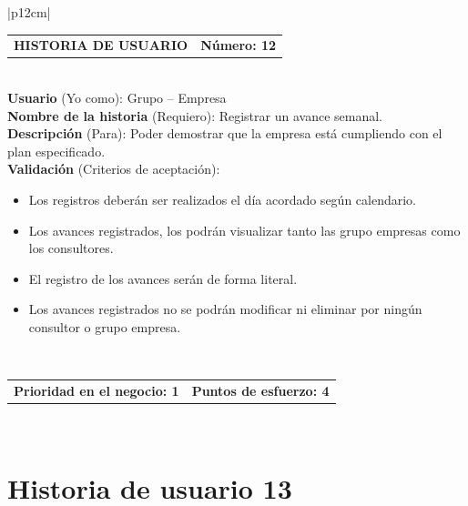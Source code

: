 \documentclass[11pt,letterpaper]{report}
\begin{document}
	\begin{center}	
		\begin{tabular}{|p{12cm}|}
			\hline
			\begin{tabular}{c|c}
				\textbf{HISTORIA DE USUARIO} & \textbf{Número: 12} \\
			\end{tabular} \\ \hline
			\textbf{Usuario} (Yo como): Grupo – Empresa \\ \hline
			\textbf{Nombre de la historia} (Requiero): Registrar un avance semanal. \\ \hline
			\textbf{Descripción} (Para): Poder demostrar que la empresa está cumpliendo con el plan especificado. \\ \hline
			\textbf{Validación} (Criterios de aceptación): \\
			\begin{minipage}{12cm}
				\begin{itemize}
					\item Los registros deberán ser realizados el día acordado según calendario.
					\item Los avances registrados, los podrán visualizar tanto las grupo empresas como los consultores.
					\item El registro de los avances serán de forma literal.
					\item Los avances registrados no se podrán modificar ni eliminar por ningún consultor o grupo empresa.
				\end{itemize}
			\end{minipage} \\ \hline
			\begin{tabular}{c|c}
				\textbf{Prioridad en el negocio: 1} & \textbf{Puntos de esfuerzo: 4} \\
			\end{tabular} \\ \hline
		\end{tabular}
	\end{center}
	
	\section{Historia de usuario 13}
	
\end{document}
